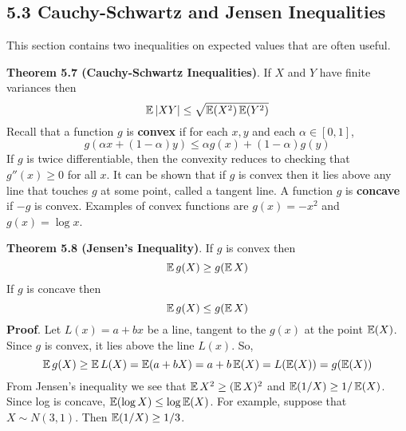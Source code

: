 \subsection*{5.3 Cauchy-Schwartz and Jensen
Inequalities}\label{cauchy-schwartz-and-jensen-inequalities}
This section contains two inequalities on expected values that are often
useful.

\textbf{Theorem 5.7 (Cauchy-Schwartz Inequalities)}. If \(X\) and \(Y\)
have finite variances then
\[
\EXP|XY| \leq \sqrt{\EXP\left(X^{2}\right) \EXP\left(Y^{2}\right)}
\]
Recall that a function \(g\) is \textbf{convex} if for each \(x, y\) and
each \(\alpha \in [0, 1]\),
\[
g(\alpha x + (1 - \alpha)y) \leq \alpha g(x) + (1 - \alpha) g(y)
\]
If \(g\) is twice differentiable, then the convexity reduces to checking
that \(g''(x) \geq 0\) for all \(x\). It can be shown that if \(g\) is
convex then it lies above any line that touches \(g\) at some point,
called a tangent line. A function \(g\) is \textbf{concave} if \(-g\) is
convex. Examples of convex functions are \(g(x) = -x^{2}\) and
\(g(x) = \log x\).

\textbf{Theorem 5.8 (Jensen's Inequality)}. If \(g\) is convex then
\[
\operatorname{\mathbb{E}} g(X) \geq g(\operatorname{\mathbb{E}} X)
\]
If \(g\) is concave then
\[
\operatorname{\mathbb{E}} g(X) \leq g(\operatorname{\mathbb{E}} X)
\]
\textbf{Proof}. Let \(L(x) = a + bx\) be a line, tangent to the \(g(x)\)
at the point \(\operatorname{\mathbb{E}}(X)\). Since \(g\) is convex, it lies above the
line \(L(x)\). So,
\[
\operatorname{\mathbb{E}} g(X) \geq \operatorname{\mathbb{E}} L(X) = \operatorname{\mathbb{E}}(a + bX) = a + b\operatorname{\mathbb{E}}(X) = L(\operatorname{\mathbb{E}}(X)) = g(\operatorname{\mathbb{E}}(X))
\]
From Jensen's inequality we see that
\(\operatorname{\mathbb{E}} X^{2} \geq (\operatorname{\mathbb{E}} X)^{2}\) and
\(\operatorname{\mathbb{E}}(1/X) \geq 1 / \operatorname{\mathbb{E}}(X)\). Since log is concave,
\(\operatorname{\mathbb{E}}(\log X) \leq \log \operatorname{\mathbb{E}}(X)\). For example, suppose
that \(X \sim N(3, 1)\). Then \(\operatorname{\mathbb{E}}(1 / X) \geq 1/3\).

